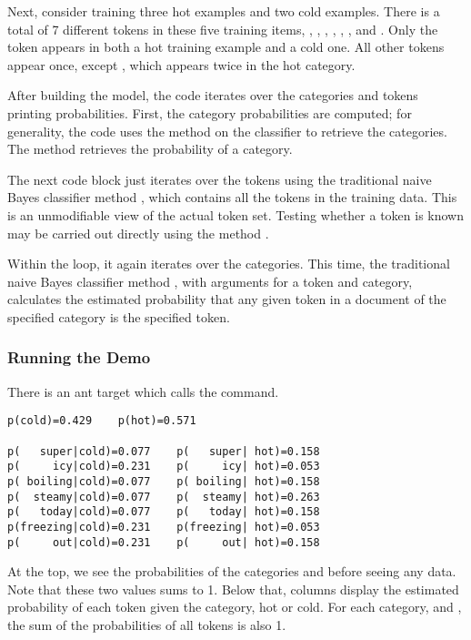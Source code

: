 Next, consider training three hot examples and two cold examples.
%
%
There is a total of 7 different tokens in these five training items,
, , ,
, ,
, and .  Only the token
 appears in both a hot training example and a cold one.
All other tokens appear once, except ,
which appears twice in the hot category.

After building the model, the code iterates over the categories and
tokens printing probabilities.  First, the category probabilities
are computed; for generality, the code uses the method 
on the classifier to retrieve the categories.
%
%
The method  retrieves the probability of a category.

The next code block just iterates over the tokens using the
traditional naive Bayes classifier method ,
which contains all the tokens in the training data.  This is
an unmodifiable view of the actual token set.  Testing whether
a token is known may be carried out directly using the method
.

Within the loop, it again iterates over the categories.  This time,
the traditional naive Bayes classifier method , with
arguments for a token and category, calculates the estimated
probability that any given token in a document of the specified
category is the specified token.
%


\subsubsection{Running the Demo}

There is an ant target  which calls the 
command.

\begin{verbatim}
p(cold)=0.429    p(hot)=0.571

p(   super|cold)=0.077    p(   super| hot)=0.158
p(     icy|cold)=0.231    p(     icy| hot)=0.053
p( boiling|cold)=0.077    p( boiling| hot)=0.158
p(  steamy|cold)=0.077    p(  steamy| hot)=0.263
p(   today|cold)=0.077    p(   today| hot)=0.158
p(freezing|cold)=0.231    p(freezing| hot)=0.053
p(     out|cold)=0.231    p(     out| hot)=0.158
\end{verbatim}
%
At the top, we see the probabilities of the categories
 and  before seeing any data.
Note that these two values sums to 1.  Below that, columns display the
estimated probability of each token given the category, hot or cold.
For each category,  and , 
the sum of the probabilities of all tokens is also 1.  

